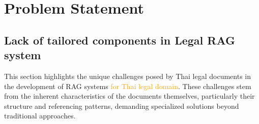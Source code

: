 \section{Problem Statement}





\subsection{Lack of tailored components in Legal RAG system}

This section highlights the unique challenges posed by Thai legal documents in the development of RAG systems \textcolor{orange}{for Thai legal domain}. These challenges stem from the inherent characteristics of the documents themselves, particularly their structure and referencing patterns, demanding specialized solutions beyond traditional approaches.

